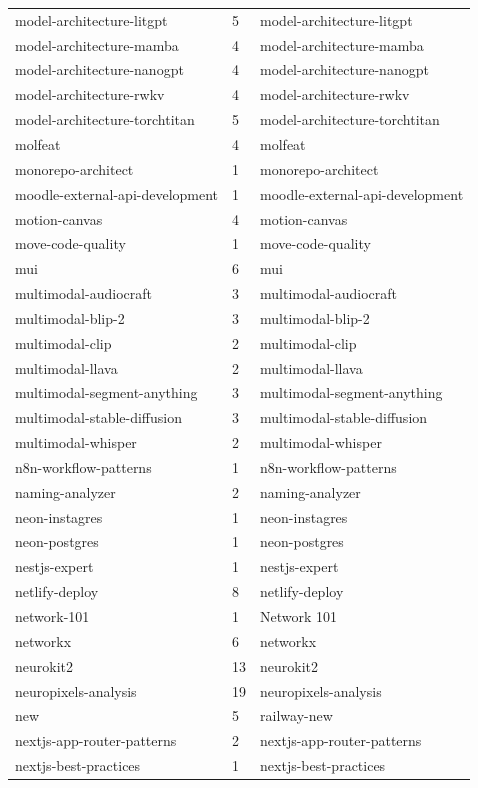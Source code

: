 \begin{longtable}{@{}lll@{}}
model-architecture-litgpt & 5 & model-architecture-litgpt\\
model-architecture-mamba & 4 & model-architecture-mamba\\
model-architecture-nanogpt & 4 & model-architecture-nanogpt\\
model-architecture-rwkv & 4 & model-architecture-rwkv\\
model-architecture-torchtitan & 5 & model-architecture-torchtitan\\
molfeat & 4 & molfeat\\
monorepo-architect & 1 & monorepo-architect\\
moodle-external-api-development & 1 & moodle-external-api-development\\
motion-canvas & 4 & motion-canvas\\
move-code-quality & 1 & move-code-quality\\
mui & 6 & mui\\
multimodal-audiocraft & 3 & multimodal-audiocraft\\
multimodal-blip-2 & 3 & multimodal-blip-2\\
multimodal-clip & 2 & multimodal-clip\\
multimodal-llava & 2 & multimodal-llava\\
multimodal-segment-anything & 3 & multimodal-segment-anything\\
multimodal-stable-diffusion & 3 & multimodal-stable-diffusion\\
multimodal-whisper & 2 & multimodal-whisper\\
n8n-workflow-patterns & 1 & n8n-workflow-patterns\\
naming-analyzer & 2 & naming-analyzer\\
neon-instagres & 1 & neon-instagres\\
neon-postgres & 1 & neon-postgres\\
nestjs-expert & 1 & nestjs-expert\\
netlify-deploy & 8 & netlify-deploy\\
network-101 & 1 & Network 101\\
networkx & 6 & networkx\\
neurokit2 & 13 & neurokit2\\
neuropixels-analysis & 19 & neuropixels-analysis\\
new & 5 & railway-new\\
nextjs-app-router-patterns & 2 & nextjs-app-router-patterns\\
nextjs-best-practices & 1 & nextjs-best-practices\\

\end{longtable}
